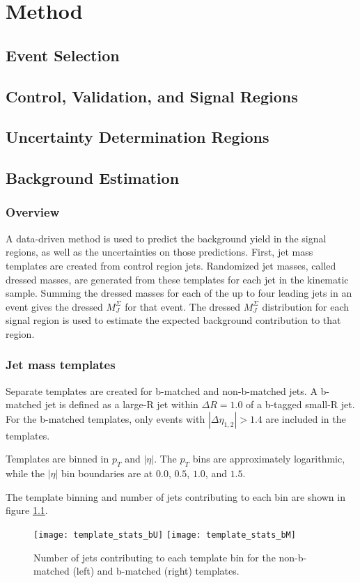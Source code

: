 \chapter{Method}
\section{Event Selection}
\section{Control, Validation, and Signal Regions}
\section{Uncertainty Determination Regions}
\section{Background Estimation}
\subsection{Overview}
A data-driven method is used to predict the background yield in the
signal regions, as well as the uncertainties on those
predictions. First, jet mass templates are created from control region jets.
Randomized jet masses, called dressed masses, are generated from
these templates for each jet in the kinematic sample. Summing the
dressed masses for each of the up to four leading jets in an event gives the
dressed $M_{J}^{\Sigma}$ for that event. The dressed $M_{J}^{\Sigma}$
distribution for each signal region is
used to estimate the expected background contribution to that region.
\subsection{Jet mass templates}
Separate templates are created for b-matched and non-b-matched jets. A
b-matched jet is defined as a large-R jet within $\Delta R = 1.0$ of
a b-tagged small-R jet. For the b-matched templates, only events with
$|\Delta \eta_{1,2}| > 1.4$ are included in the templates.

Templates are binned in $p_T$ and $|\eta|$. The $p_T$ bins are
approximately logarithmic, while the $|\eta|$ bin boundaries are at
$0.0$, $0.5$, $1.0$, and $1.5$. 

The template binning and number of jets contributing to each bin are
shown in figure \ref{fig:template_stats}.

\begin{figure}[h]
\texttt{[image: template\_stats\_bU]}
\texttt{[image: template\_stats\_bM]}
\caption{Number of jets contributing to each template bin for the
  non-b-matched (left) and b-matched (right) templates.}
\label{fig:template_stats}
\end{figure}

